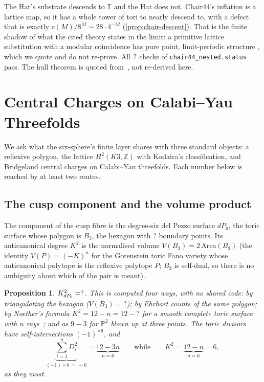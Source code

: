 \documentclass[11pt,a4paper]{article}
\newcommand{\SSDPVolume}{?}\newcommand{\SSDPBoundary}{?}
\newcommand{\SSDPRays}{?}
\newcommand{\ZZ}{\mathbb{Z}}
\newcommand{\TT}{\mathbb{T}}
\theoremstyle{plain}
\newtheorem{proposition}{Proposition}
\theoremstyle{definition}
\begin{document}
The Hat's substrate descends to $\TT$ and the Hat does not. Chair44's inflation is a
lattice map, so it has a whole tower of tori to nearly descend to, with a defect that is
exactly $c(M)/8^M\sim28\cdot4^{-M}$ (\cref{prop:chair-descent}). That is the finite
shadow of what the cited theory states in the limit: a primitive lattice substitution
with a modular coincidence has pure point, limit-periodic structure
\cite{LeeMoody,Schlottmann,LMS}, which we quote and do not re-prove. All
$?{}$ checks of \texttt{chair44\_nested.status} pass. The hull theorem is quoted
from~\cite{HartshornRomanov}, not re-derived here.


\section{Central Charges on Calabi--Yau Threefolds}
\label{sec:links}

We ask what the six-sphere's finite layer shares with three standard objects: a
reflexive polygon, the lattice $H^2(K3,\ZZ)$ with Kodaira's classification, and
Bridgeland central charges on Calabi--Yau threefolds. Each number below is
reached by at least two routes.

\subsection{The cusp component and the volume product}
\label{sec:links-mahler}

The component of the cusp fibre is the degree-six del Pezzo surface $dP_6$,
the toric surface whose polygon is $B_3$, the hexagon with \SSDPBoundary{}
boundary points. Its anticanonical degree $K^2$ is the normalised volume
$V(B_3) = 2\,\mathrm{Area}(B_3)$ (the identity $V(P) = (-K)^n$ for the
Gorenstein toric Fano variety whose anticanonical polytope is the reflexive
polytope $P$; $B_3$ is self-dual, so there is no ambiguity about which of the
pair is meant).

\begin{proposition}
\label{prop:dp6}
$K^2_{dP_6} = ?$. This is computed four ways, with no shared code:
by triangulating the hexagon ($V(B_3) = \SSDPVolume$); by Ehrhart counts of
the same polygon; by Noether's formula $K^2 = 12 - n = 12 - \SSDPRays$ for a
smooth complete toric surface with $n$ rays~\cite{Fulton}; and as $9 - 3$ for
$\mathbb{P}^2$ blown up at three points. The toric divisors have self-intersections $(-1)^{\times 6}$, and
\[
  \underbrace{\textstyle\sum_{i=1}^{n} D_i^2}_{(-1)\times 6\,=\,-6}
  =\underbrace{12-3n}_{n=6}
  \qquad\text{while}\qquad
  K^2=\underbrace{12-n}_{n=6}=6 ,
\]
as they must.
\end{proposition}
\end{document}
